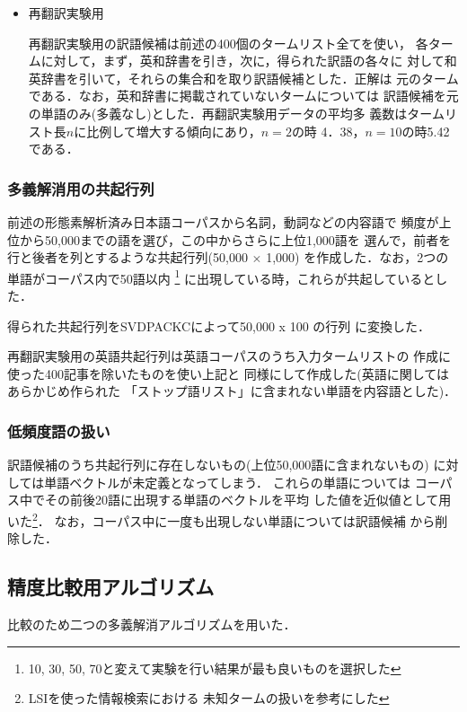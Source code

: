 \begin{itemize}
\item 再翻訳実験用

  再翻訳実験用の訳語候補は前述の400個のタームリスト全てを使い，
各タームに対して，まず，英和辞書を引き，次に，得られた訳語の各々に
対して和英辞書を引いて，それらの集合和を取り訳語候補とした．正解は
元のタームである．なお，英和辞書に掲載されていないタームについては
訳語候補を元の単語のみ(多義なし)とした．再翻訳実験用データの平均多
義数はタームリスト長$n$に比例して増大する傾向にあり，$n = 2$の時
4．38，$n = 10$の時5.42である．

\end{itemize}

\subsubsection{多義解消用の共起行列}

  前述の形態素解析済み日本語コーパスから名詞，動詞などの内容語で
頻度が上位から50,000までの語を選び，この中からさらに上位1,000語を
選んで，前者を行と後者を列とするような共起行列(50,000 $ \times $ 1,000)
を作成した．なお，2つの単語がコーパス内で50語以内
\footnote{10, 30, 50, 70と変えて実験を行い結果が最も良いものを選択した}
に出現している時，これらが共起しているとした．

  得られた共起行列をSVDPACKC\cite{Berry93}によって50,000 x 100 の行列
に変換した．

  再翻訳実験用の英語共起行列は英語コーパスのうち入力タームリストの
作成に使った400記事を除いたものを使い上記と
同様にして作成した(英語に関してはあらかじめ作られた
「ストップ語リスト」に含まれない単語を内容語とした)． 

\subsubsection{低頻度語の扱い}

  訳語候補のうち共起行列に存在しないもの(上位50,000語に含まれないもの)
に対しては単語ベクトルが未定義となってしまう． これらの単語については
コーパス中でその前後20語に出現する単語のベクトルを平均
した値を近似値として用いた\footnote{LSIを使った情報検索における
未知タームの扱い\cite{Dumais94}を参考にした}． 
なお，コーパス中に一度も出現しない単語については訳語候補
から削除した． 

\subsection{精度比較用アルゴリズム}

  比較のため二つの多義解消アルゴリズムを用いた． 


